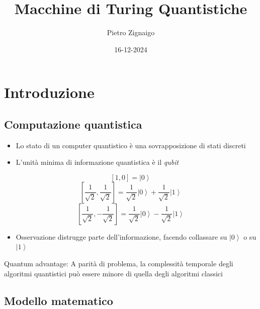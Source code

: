 \documentclass{beamer}
\title
{Macchine di Turing Quantistiche}
\author
{Pietro Zignaigo}
\institute
{Università di Genova}
\date
{16-12-2024}
\begin{document}
\begin{frame}
	\titlepage
\end{frame}

\begin{frame}
	\tableofcontents
\end{frame}

\section{Introduzione}

\subsection{Computazione quantistica}

\begin{frame}{\subsecname}{}
	\begin{itemize}
		\item Lo stato di un computer quantistico è una sovrapposizione di stati discreti
		\item L'unità minima di informazione quantistica è il \textit{qubit}
	\end{itemize}
	\[ \left [ 1 , 0 \right ] = \left | 0 \right \rangle \]
	\[ \left [ \frac{1}{\sqrt{2}} , \frac{1}{\sqrt{2}} \right ] = \frac{1}{\sqrt{2}} \left | 0 \right \rangle + \frac{1}{\sqrt{2}} \left | 1 \right \rangle \]
	\[ \left [ \frac{1}{\sqrt{2}} , -\frac{1}{\sqrt{2}} \right ] = \frac{1}{\sqrt{2}} \left | 0 \right \rangle - \frac{1}{\sqrt{2}} \left | 1 \right \rangle \]
	\begin{itemize}
		\item Osservazione distrugge parte dell'informazione, facendo collassare su \( \left | 0 \right \rangle \) o su \( \left | 1 \right \rangle \)
	\end{itemize}
\end{frame}

\begin{frame}{\subsecname}{}
	Quantum advantage: A parità di problema, la complessità temporale degli algoritmi quantistici può essere minore di quella degli algoritmi classici
\end{frame}

\subsection{Modello matematico}
\end{document}
